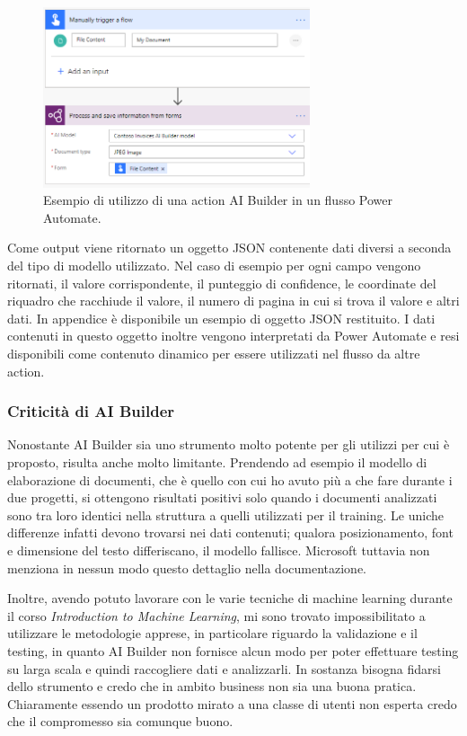 \begin{figure}[ht!]
  \centering
  \includegraphics[width=0.7\textwidth]{flow-ai-builder.png}
  \caption{Esempio di utilizzo di una action AI Builder in un flusso Power Automate.}
  \label{fig:flowAIBuilder}
\end{figure}

Come output viene ritornato un oggetto JSON contenente dati diversi a seconda del tipo di modello utilizzato. Nel caso di esempio per ogni campo vengono ritornati, il valore corrispondente, il punteggio di confidence, le coordinate del riquadro che racchiude il valore, il numero di pagina in cui si trova il valore e altri dati. In appendice è disponibile un esempio di oggetto JSON restituito.
I dati contenuti in questo oggetto inoltre vengono interpretati da Power Automate e resi disponibili come contenuto dinamico per essere utilizzati nel flusso da altre action.

\subsubsection{Criticità di AI Builder}
Nonostante AI Builder sia uno strumento molto potente per gli utilizzi per cui è proposto, risulta anche molto limitante. Prendendo ad esempio il modello di elaborazione di documenti, che è quello con cui ho avuto più a che fare durante i due progetti, si ottengono risultati positivi solo quando i documenti analizzati sono tra loro identici nella struttura a quelli utilizzati per il training. Le uniche differenze infatti devono trovarsi nei dati contenuti; qualora posizionamento, font e dimensione del testo differiscano, il modello fallisce. Microsoft tuttavia non menziona in nessun modo questo dettaglio nella documentazione.

Inoltre, avendo potuto lavorare con le varie tecniche di machine learning durante il corso \textit{Introduction to Machine Learning}, mi sono trovato impossibilitato a utilizzare le metodologie apprese, in particolare riguardo la validazione e il testing, in quanto AI Builder non fornisce alcun modo per poter effettuare testing su larga scala e quindi raccogliere dati e analizzarli. In sostanza bisogna fidarsi dello strumento e credo che in ambito business non sia una buona pratica. Chiaramente essendo un prodotto mirato a una classe di utenti non esperta credo che il compromesso sia comunque buono.






